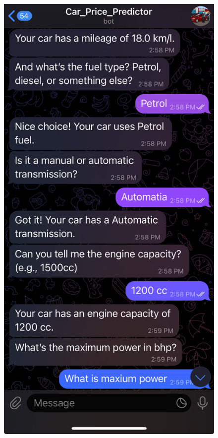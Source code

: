 \documentclass[a4paper,12pt]{article}
\begin{document}
\begin{justify}
\begin{figure}[h!]
	\centering
	\begin{minipage}{0.45\textwidth}
		\centering
		\includegraphics[width=\textwidth]{3.jpg}

\end{minipage}
\end{figure}
\end{justify}
\end{document}
